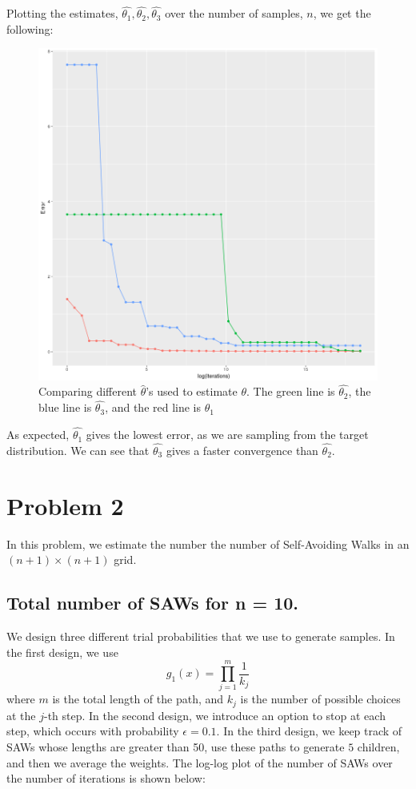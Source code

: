 \documentclass[journal, a4paper]{IEEEtran}
\begin{document}
	Plotting the estimates, $\hat{\theta_1}, \hat{\theta_2}, \hat{\theta_3}$ over the number of samples, $n$, we get the following:
	
	\begin{figure}[h]
	\begin{center}
		\includegraphics[width = 0.8\columnwidth]{theta}
	\end{center}
	\caption{Comparing different $\hat{\theta}$'s used to estimate $\theta$. The green line is $\hat{\theta_2}$, 
	the blue line is $\hat{\theta_3}$, and the red line is $\theta_1$ \label{fig:theta}}
	\end{figure}
	
	As expected, $\hat{\theta_1}$ gives the lowest error, as we are sampling from the target distribution. We can see that $\hat{\theta_3}$ gives
	a faster convergence than $\hat{\theta_2}$.
	
\section*{Problem 2}
	In this problem, we estimate the number the number of Self-Avoiding Walks in an $(n+1) \times (n+1)$ grid. 
	\subsection{Total number of SAWs for n = 10.}
	We design three different trial probabilities that we use to generate samples. In the first design, we use $$g_1(x) = \prod_{j=1}^m \frac{1}{k_j}$$
	where $m$ is the total length of the path, and $k_j$ is the number of possible choices at the $j$-th step. In the second design, we introduce an option to stop at each step,
	which occurs with probability $\epsilon = 0.1$. In the third design, we keep track of SAWs whose lengths are greater than 50, use these paths to generate $5$ children, and 
	then we average the weights. The log-log plot of the number of SAWs over the number of iterations is shown below:
	
\end{document}
